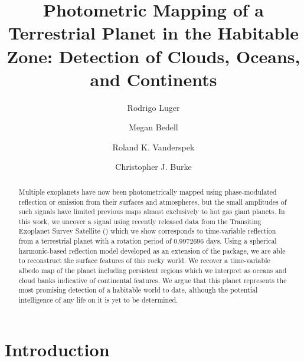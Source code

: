 \documentclass[modern]{aastex62}
\begin{document}

\title{\TESS Photometric Mapping of a Terrestrial Planet in the Habitable Zone: 
       Detection of Clouds, Oceans, and Continents}

\author[0000-0002-0296-3826]{Rodrigo Luger}
%
\author[0000-0002-9328-5652]{Megan Bedell}
%
\author{Roland K. Vanderspek}
%
\author{Christopher J. Burke}

\begin{abstract}
Multiple exoplanets have now been photometrically mapped using phase-modulated 
reflection or emission from their surfaces and atmospheres, but the small amplitudes 
of such signals have limited previous maps almost exclusively to hot gas giant planets. 
In this work, we uncover a signal using recently released data from the Transiting 
Exoplanet Survey Satellite (\TESS) which we show corresponds to time-variable reflection 
from a terrestrial 
planet with a rotation period of $0.9972696$ days. 
Using a spherical harmonic-based reflection model developed as an extension of 
the \starry package, we are able to reconstruct the surface features of this rocky 
world. We recover a time-variable albedo map of the planet including persistent 
regions which we interpret as oceans and cloud banks indicative of continental features. 
We argue that this planet represents the most promising detection of a habitable 
world to date, although the potential intelligence of any life on it is yet to 
be determined.
\end{abstract}


\section{Introduction}
\label{sec:intro}
\end{document}
